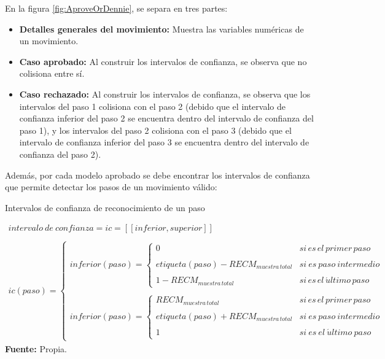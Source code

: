 En la figura \ref{fig:AproveOrDennie}, se separa en tres partes:
\begin{itemize}
\item \textbf{Detalles generales del movimiento:} Muestra las variables num\'ericas de un movimiento.
\item \textbf{Caso aprobado:} Al construir los intervalos de confianza, se observa que no colisiona entre s\'i.
\item \textbf{Caso rechazado:} Al construir los intervalos de confianza, se observa que los intervalos del paso 1 colisiona con el paso 2 (debido que el intervalo de confianza inferior del paso 2 se encuentra dentro del intervalo de confianza del paso 1), y los intervalos del paso 2 colisiona con el paso 3 (debido que el intervalo de confianza inferior del paso 3 se encuentra dentro del intervalo de confianza del paso 2).
\end{itemize}
Adem\'as, por cada modelo aprobado se debe encontrar los intervalos de confianza  que permite detectar los pasos de un movimiento v\'alido:
\begin{formula}[H]
	\centering
	\caption{Intervalos de confianza de reconocimiento de un paso}
	\label{frm:rangoConfiabilidad}
	\begin{equation}
\begin{matrix}

intervalo\: de\: confianza = ic =[[inferior,superior]] \\
\\
ic(paso)=\left\{\begin{matrix}
inferior(paso)=\left\{\begin{matrix}
0 & si\, es\, el\, primer\, paso\\ \\ 
etiqueta(paso)- RECM_{muestra\, total} & si\: es\: paso\: intermedio \\ 
\\
1-RECM_{muestra\, total}& si\, es\, el\, \acute{u}ltimo\, paso
\end{matrix}\right. \\ 
\\ 
inferior(paso)=\left\{\begin{matrix}
RECM_{muestra\, total}& si\, es\, el\, primer\, paso \\
\\
etiqueta(paso)+RECM_{muestra\, total} & si\: es\: paso\: intermedio \\ \\ 
1 & si\: es\: el\: \acute{u}ltimo\: paso
\end{matrix}\right.
\end{matrix}\right.
\end{matrix}
	\end{equation}
	\textbf{Fuente:} Propia.
\end{formula} 
